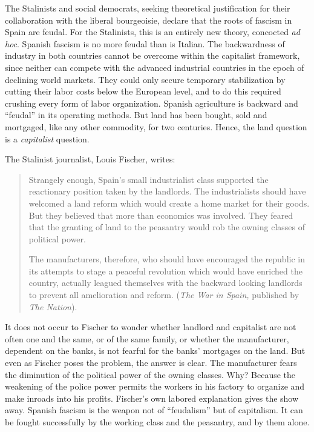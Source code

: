 The Stalinists and social democrats, seeking theoretical justification for their collaboration with the liberal bourgeoisie, declare that the roots of fascism in Spain are feudal. For the Stalinists, this is an entirely new theory, concocted \emph{ad hoc}. Spanish fascism is no more feudal than is Italian. The backwardness of industry in both countries cannot be overcome within the capitalist framework, since neither can compete with the advanced industrial countries in the epoch of declining world markets. They could only secure temporary stabilization by cutting their labor costs below the European level, and to do this required crushing every form of labor organization. Spanish agriculture is backward and ``feudal'' in its operating methods. But land has been bought, sold and mortgaged, like any other commodity, for two centuries. Hence, the land question is a \emph{capitalist} question.
\noclub

\smallskip

The Stalinist journalist, Louis Fischer,{\indexLFischer} writes:

\begin{quotation}
  \sloppy
  
  Strangely enough, Spain’s small industrialist class supported the reactionary position taken by the landlords. The industrialists should have welcomed a land reform which would create a home market for their goods. But they believed that more than economics was involved. They feared that the granting of land to the peasantry would rob the owning classes of political power.
  
  The manufacturers, therefore, who should have encouraged the republic in its attempts to stage a peaceful revolution which would have enriched the country, actually leagued themselves with the backward looking landlords to prevent all amelioration and reform. (\emph{The War in Spain,} published by \emph{The Nation}).
\end{quotation}

It does not occur to Fischer to wonder whether landlord and capitalist are not often one and the same, or of the same family, or whether the manufacturer, dependent on the banks, is not fearful for the banks’ mortgages on the land. But even as Fischer poses the problem, the answer is clear. The manufacturer fears the diminution of the political power of the owning classes. Why? Because the weakening of the police power permits the workers in his factory to organize and make inroads into his profits. Fischer’s own labored explanation gives the show away. Spanish fascism is the weapon not of ``feudalism'' but of capitalism. It can be fought successfully by the working class and the peasantry, and by them alone.